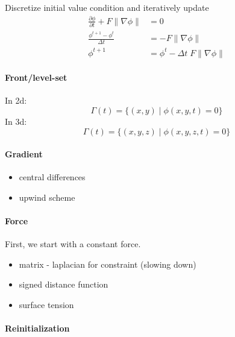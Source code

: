 \documentclass{article}
\begin{document}

Discretize initial value condition and iteratively update
\begin{align}
    \frac{\partial \phi}{\partial t} + F \|\nabla \phi\| &= 0 \\
    \frac{\phi^{t+1} - \phi^{t}}{\Delta t} &=  -F \|\nabla \phi\| \\
    \phi^{t+1} &= \phi^{t} - \Delta t \; F \|\nabla \phi\| 
\end{align}

\paragraph{Front/level-set}
In 2d:
\[
\Gamma(t) = \{(x,y) \; | \; \phi(x,y,t) = 0\}
\]
In 3d:
\[
\Gamma(t) = \{(x,y,z) \; | \; \phi(x,y,z,t) = 0\}
\]

\paragraph{Gradient}
\begin{itemize}
\item central differences
\item upwind scheme
\end{itemize}

\paragraph{Force}
First, we start with a constant force.
\begin{itemize}
\item matrix - laplacian for constraint (slowing down)
\item signed distance function
\item surface tension
\end{itemize}

\paragraph{Reinitialization}
\end{document}
